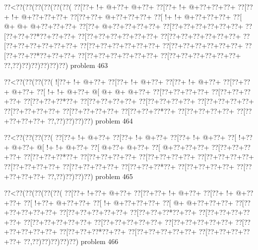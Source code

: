 \vbox{\vbox{\goo
\0??<\0??(\0??(\0??(\0??(\0??(\0??(
\0??[\0??+\- !+\- @+\0??+\- @+\0??+
\0??[\0??+\- !+\- @+\0??+\0??+\0??+
\0??[\0??+\- !+\- @+\0??+\0??+\0??+
\0??[\0??+\0??+\- @+\0??+\0??+\0??+
\0??[\- !+\- !+\- @+\0??+\0??+\0??+
\0??[\- @+\- @+\- @+\0??+\0??+\0??+
\0??[\0??+\- @+\0??+\0??+\0??+\0??+
\0??[\0??+\0??+\0??+\0??+\0??+\0??+
\0??[\0??+\0??+\0??*\0??+\0??+\0??+
\0??[\0??+\0??+\0??+\0??+\0??+\0??+
\0??[\0??+\0??+\0??+\0??+\0??+\0??+
\0??[\0??+\0??+\0??+\0??+\0??+\0??+
\0??[\0??+\0??+\0??+\0??+\0??+\0??+
\0??[\0??+\0??+\0??+\0??+\0??+\0??+
\0??[\0??+\0??+\0??*\0??+\0??+\0??+
\0??[\0??+\0??+\0??+\0??+\0??+\0??+
\0??[\0??+\0??+\0??+\0??+\0??+\0??+
\0??,\0??)\0??)\0??)\0??)\0??)\0??)
}
\hfil problem 463\hfil\break
}

\vbox{\vbox{\goo
\0??<\0??(\0??(\0??(\0??(
\- ![\0??+\- !+\- @+\0??+
\0??[\0??+\- !+\- @+\0??+
\0??[\0??+\- !+\- @+\0??+
\0??[\0??+\0??+\- @+\0??+
\0??[\- !+\- !+\- @+\0??+
\- @[\- @+\- @+\- @+\0??+
\0??[\0??+\0??+\0??+\0??+
\0??[\0??+\0??+\0??+\0??+
\0??[\0??+\0??+\0??*\0??+
\0??[\0??+\0??+\0??+\0??+
\0??[\0??+\0??+\0??+\0??+
\0??[\0??+\0??+\0??+\0??+
\0??[\0??+\0??+\0??+\0??+
\0??[\0??+\0??+\0??+\0??+
\0??[\0??+\0??+\0??*\0??+
\0??[\0??+\0??+\0??+\0??+
\0??[\0??+\0??+\0??+\0??+
\0??,\0??)\0??)\0??)\0??)
}
\hfil problem 464\hfil\break
}

\vbox{\vbox{\goo
\0??<\0??(\0??(\0??(\0??(
\0??[\0??+\- !+\- @+\0??+
\0??[\0??+\- !+\- @+\0??+
\0??[\0??+\- !+\- @+\0??+
\0??[\- !+\0??+\- @+\0??+
\- @[\- !+\- !+\- @+\0??+
\0??[\- @+\0??+\- @+\0??+
\0??[\- @+\0??+\0??+\0??+
\0??[\0??+\0??+\0??+\0??+
\0??[\0??+\0??+\0??*\0??+
\0??[\0??+\0??+\0??+\0??+
\0??[\0??+\0??+\0??+\0??+
\0??[\0??+\0??+\0??+\0??+
\0??[\0??+\0??+\0??+\0??+
\0??[\0??+\0??+\0??+\0??+
\0??[\0??+\0??+\0??*\0??+
\0??[\0??+\0??+\0??+\0??+
\0??[\0??+\0??+\0??+\0??+
\0??,\0??)\0??)\0??)\0??)
}
\hfil problem 465\hfil\break
}

\vbox{\vbox{\goo
\0??<\0??(\0??(\0??(\0??(\0??(
\0??[\0??+\- !+\0??+\- @+\0??+
\0??[\0??+\0??+\- !+\- @+\0??+
\0??[\0??+\- !+\- @+\0??+\0??+
\0??[\- !+\0??+\- @+\0??+\0??+
\0??[\- !+\- @+\0??+\0??+\0??+
\0??[\- @+\- @+\0??+\0??+\0??+
\0??[\0??+\0??+\0??+\0??+\0??+
\0??[\0??+\0??+\0??+\0??+\0??+
\0??[\0??+\0??+\0??*\0??+\0??+
\0??[\0??+\0??+\0??+\0??+\0??+
\0??[\0??+\0??+\0??+\0??+\0??+
\0??[\0??+\0??+\0??+\0??+\0??+
\0??[\0??+\0??+\0??+\0??+\0??+
\0??[\0??+\0??+\0??+\0??+\0??+
\0??[\0??+\0??+\0??*\0??+\0??+
\0??[\0??+\0??+\0??+\0??+\0??+
\0??[\0??+\0??+\0??+\0??+\0??+
\0??,\0??)\0??)\0??)\0??)\0??)
}
\hfil problem 466\hfil\break
}

